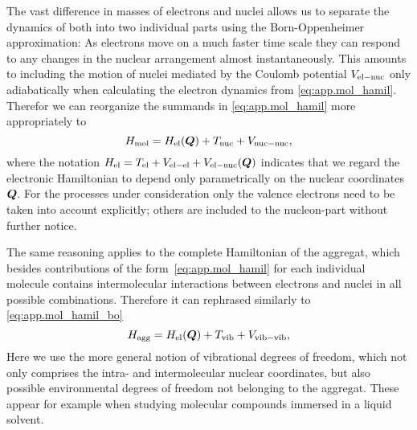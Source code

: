 The vast difference in masses of electrons and nuclei allows us to separate the dynamics of both into two individual parts using the Born-Oppenheimer approximation:
As electrons move on a much faster time scale they can respond to any changes in the nuclear arrangement almost instantaneously.
This amounts to including the motion of nuclei mediated by the Coulomb potential $V_\mathrm{el-nuc}$ only adiabatically when calculating the electron dynamics from \autoref{eq:app.mol_hamil}.
Therefor we can reorganize the summands in \autoref{eq:app.mol_hamil} more appropriately to
\begin{equation}
  H_\mathrm{mol} = H_\mathrm{el}(\boldsymbol{Q}) + T_\mathrm{nuc} + V_\mathrm{nuc-nuc},
  \label{eq:app.mol_hamil_bo}
\end{equation}
where the notation $H_\mathrm{el} = T_\mathrm{el} + V_\mathrm{el-el} + V_\mathrm{el-nuc}(\boldsymbol{Q})$ indicates that we regard the electronic Hamiltonian to depend only parametrically on the nuclear coordinates $\boldsymbol{Q}$.
For the processes under consideration only the valence electrons need to be taken into account explicitly; others are included to the nucleon-part without further notice.


The same reasoning applies to the complete Hamiltonian of the aggregat, which besides contributions of the form~\ref{eq:app.mol_hamil} for each individual molecule contains intermolecular interactions between electrons and nuclei in all possible combinations.
Therefore it can rephrased similarly to \autoref{eq:app.mol_hamil_bo}
\begin{equation}
  H_\mathrm{agg} = H_\mathrm{el}(\boldsymbol{Q}) + T_\mathrm{vib} + V_\mathrm{vib-vib},
  \label{eq:app.agg_hamil}
\end{equation}
Here we use the more general notion of vibrational degrees of freedom, which not only comprises the intra- and intermolecular nuclear coordinates, but also possible environmental degrees of freedom not belonging to the aggregat.
These appear for example when studying molecular compounds immersed in a liquid solvent.



